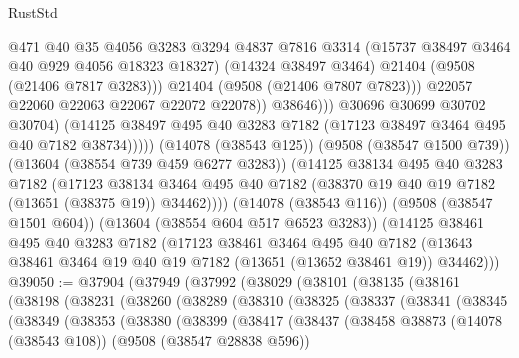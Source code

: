 \begin{lexlean}{RustStd}
\begin{coremodule}
                            @471
                            @40
                            @35
                            @4056
                            @3283
                            @3294
                            @4837
                            @7816
                            @3314
                            (@15737 @38497 @3464 @40 @929 @4056 @18323 @18327)
                            (@14324 @38497 @3464)
                            @21404
                            (@9508 (@21406 @7817 @3283)))
                          @21404
                          (@9508 (@21406 @7807 @7823)))
                        @22057
                        @22060
                        @22063
                        @22067
                        @22072
                        @22078))
                    @38646)))
              @30696
              @30699
              @30702
              @30704)
            (@14125 @38497 @495 @40 @3283 @7182 (@17123 @38497 @3464 @495 @40 @7182 @38734)))))
      (@14078 (@38543 @125))
      (@9508 (@38547 @1500 @739))
      (@13604 (@38554 @739 @459 @6277 @3283))
      (@14125
        @38134
        @495
        @40
        @3283
        @7182
        (@17123
          @38134
          @3464
          @495
          @40
          @7182
          (@38370 @19 @40 @19 @7182 (@13651 (@38375 @19)) @34462))))
    (@14078 (@38543 @116))
    (@9508 (@38547 @1501 @604))
    (@13604 (@38554 @604 @517 @6523 @3283))
    (@14125
      @38461
      @495
      @40
      @3283
      @7182
      (@17123
        @38461
        @3464
        @495
        @40
        @7182
        (@13643 @38461 @3464 @19 @40 @19 @7182 (@13651 (@13652 @38461 @19)) @34462)))
@39050 := @37904
    (@37949
      (@37992
        (@38029
          (@38101
            (@38135
              (@38161
                (@38198
                  (@38231
                    (@38260
                      (@38289
                        (@38310
                          (@38325
                            (@38337
                              (@38341
                                (@38345
                                  (@38349
                                    (@38353
                                      (@38380
                                        (@38399
                                          (@38417
                                            (@38437
                                              (@38458
                                                @38873
                                                (@14078 (@38543 @108))
                                                (@9508 (@38547 @28838 @596))

\end{coremodule}
\end{lexlean}
